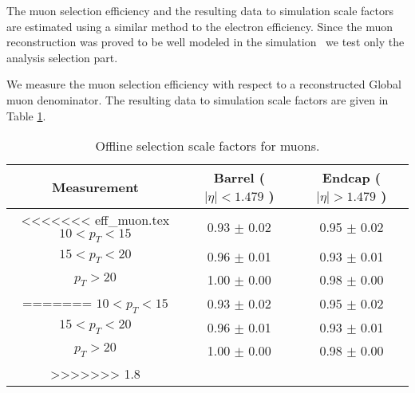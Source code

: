 
The muon selection efficiency and the resulting data to simulation
scale factors are estimated using a similar method to the electron efficiency.
Since the muon reconstruction was proved to be well modeled in the simulation~\cite{VBTFCrossSectionNote}
we test only the analysis selection part.

We measure the muon selection efficiency with respect to a reconstructed Global muon
denominator.
The resulting data to simulation scale factors are given in Table \ref{tab:eff_mu_offline}.

\begin{table}[!ht]
\begin{center}
\begin{tabular}{c|c|c}
\hline
Measurement & Barrel ( $|\eta|<1.479$ )   & Endcap ( $|\eta|>1.479$ )  \\ 
\hline
<<<<<<< eff_muon.tex
$  10<p_T<  15$ & 0.93 $\pm$ 0.02  & 0.95 $\pm$ 0.02  \\ \hline 
$  15<p_T<  20$ & 0.96 $\pm$ 0.01  & 0.93 $\pm$ 0.01  \\ \hline 
$  p_T>     20$ & 1.00 $\pm$ 0.00  & 0.98 $\pm$ 0.00  \\ \hline
=======
$  10<p_T<  15$ & 0.93 $\pm$ 0.02  & 0.95 $\pm$ 0.02  \\ \hline 
$  15<p_T<  20$ & 0.96 $\pm$ 0.01  & 0.93 $\pm$ 0.01  \\ \hline 
$  p_T>     20$ & 1.00 $\pm$ 0.00  & 0.98 $\pm$ 0.00  \\ \hline 
>>>>>>> 1.8
\end{tabular}
\caption{Offline selection scale factors for muons.}
\label{tab:eff_mu_offline}
\end{center}
\end{table}

